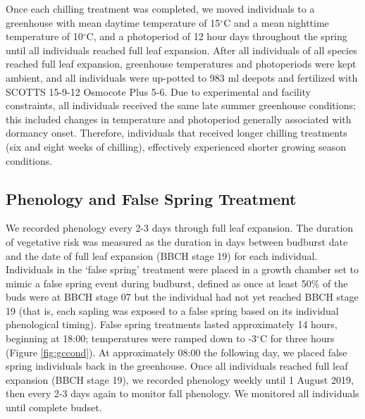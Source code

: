 \documentclass{article}\usepackage[]{graphicx}\usepackage[]{color}
\begin{document}
Once each chilling treatment was completed, we moved individuals to a greenhouse with mean daytime temperature of 15$^{\circ}$C and a mean nighttime temperature of 10$^{\circ}$C, and a photoperiod of 12 hour days throughout the spring until all individuals reached full leaf expansion. After all individuals of all species reached full leaf expansion, greenhouse temperatures and photoperiods were kept ambient, and all individuals were up-potted to 983 ml deepots and fertilized with SCOTTS 15-9-12 Osmocote Plus 5-6. Due to experimental and facility constraints, all individuals received the same late summer greenhouse conditions; this included changes in temperature and photoperiod generally associated with dormancy onset. Therefore, individuals that received longer chilling treatments (six and eight weeks of chilling), effectively experienced shorter growing season conditions. 

\subsection*{Phenology and False Spring Treatment} 
We recorded phenology \citep[using the BBCH scale,][]{Meier2001} every 2-3 days through full leaf expansion. The duration of vegetative risk \citep{Chamberlain2019} was measured as the duration in days between budburst date \citep[][BBCH07 stage;]{Finn2007} and the date of full leaf expansion (BBCH stage 19) for each individual. Individuals in the `false spring' treatment were placed in a growth chamber set to mimic a false spring event during budburst, defined as once at least 50\% of the buds were at BBCH stage 07 but the individual had not yet reached BBCH stage 19 (that is, each sapling was exposed to a false spring based on its individual phenological timing). False spring treatments lasted approximately 14 hours, beginning at 18:00; temperatures were ramped down to -3$^{\circ}$C for three hours (Figure \ref{fig:gccond}). At approximately 08:00 the following day, we placed false spring individuals back in the greenhouse. Once all individuals reached full leaf expansion (BBCH stage 19), we recorded phenology weekly until 1 August 2019, then every 2-3 days again to monitor fall phenology. We monitored all individuals until complete budset. 
\end{document}
